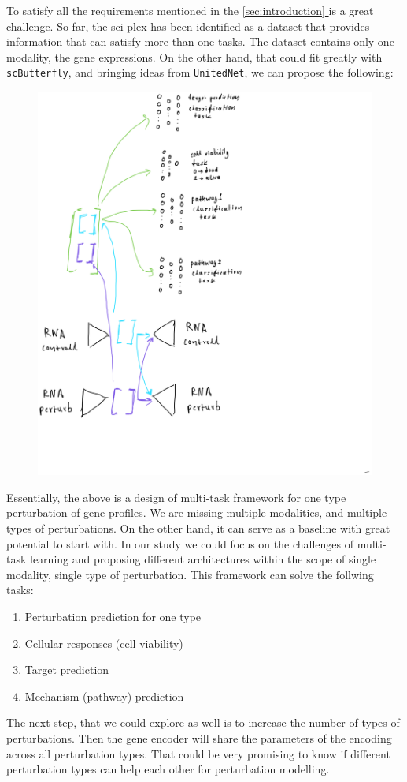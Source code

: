 \documentclass[12pt, a4paper]{article}
\newcommand*{\fullref}[1]{\hyperref[{#1}]{\ref*{#1} \nameref*{#1}}}
\begin{document}
To satisfy all the requirements mentioned in the \fullref{sec:introduction} is a great challenge. So far, the sci-plex has been identified as a dataset that provides information that can satisfy more than one tasks. The dataset contains only one modality, the gene expressions. On the other hand, that could fit greatly with \verb|scButterfly|, and bringing ideas from \verb|UnitedNet|, we can propose the following:

\begin{figure}[h!]
  \centering
  \includegraphics[width=.6\textwidth]{my_multi_one_mod.PNG}
  \caption{}
  \label{}
\end{figure}

Essentially, the above is a design of multi-task framework for one type perturbation of gene profiles. We are missing multiple modalities, and multiple types of perturbations. On the other hand, it can serve as a baseline with great potential to start with. In our study we could focus on the challenges of multi-task learning and proposing different architectures within the scope of single modality, single type of perturbation. This framework can solve the follwing tasks:

\begin{enumerate}
  \item Perturbation prediction for one type
  \item Cellular responses (cell viability)
  \item Target prediction
  \item Mechanism (pathway) prediction
\end{enumerate}

The next step, that we could explore as well is to increase the number of types of perturbations. Then the gene encoder will share the parameters of the encoding across all perturbation types. That could be very promising to know if different perturbation types can help each other for perturbation modelling.
\end{document}
